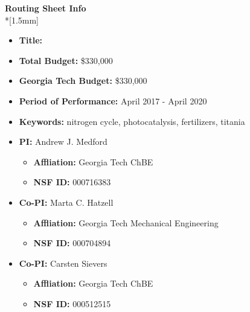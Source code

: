 \renewcommand{\LeftFooter}{Cover Sheet}
\renewcommand{\PageLimit}{0} %

\begin{center}
\textbf{\textsf{\large Routing Sheet Info}} \\*[1.5mm]
\end{center}

\begin{itemize}
\item \textbf{Title:}  \@title
\item \textbf{Total Budget:} 
\$330,000
\item \textbf{Georgia Tech Budget:} 
\$330,000
\item \textbf{Period of Performance:} 
April 2017 - April 2020
\item \textbf{Keywords:} 
nitrogen cycle, photocatalysis, fertilizers, titania
\item \textbf{PI:} 
Andrew J. Medford
 \begin{itemize}
 \item \textbf{Affliation:} Georgia Tech ChBE
 \item \textbf{NSF ID:}  000716383
 \end{itemize}
\item \textbf{Co-PI:} 
Marta C. Hatzell
 \begin{itemize}
 \item \textbf{Affliation:} Georgia Tech Mechanical Engineering
 \item \textbf{NSF ID:}  000704894
 \end{itemize}
\item \textbf{Co-PI:} 
Carsten Sievers
 \begin{itemize}
 \item \textbf{Affliation:} Georgia Tech ChBE
 \item \textbf{NSF ID:}  000512515
 \end{itemize}
 

\end{itemize}
